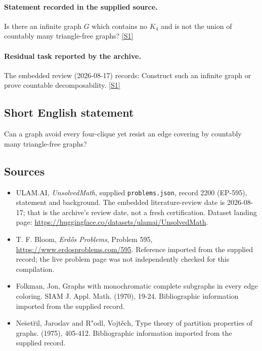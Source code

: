 \documentclass[11pt,a4paper]{article}
\newcommand{\sref}[2]{\hyperlink{source:#1:#2}{[S#2]}}
\begin{document}
\paragraph{Statement recorded in the supplied source.}
Is there an infinite graph $G$ which contains no $K_4$ and is not the union of countably many triangle-free graphs? \sref{2200}{1}

\paragraph{Residual task reported by the archive.}

The embedded review (2026-08-17) records: Construct such an infinite graph or prove countable decomposability. \sref{2200}{1}

\subsection{Short English statement}

Can a graph avoid every four-clique yet resist an edge covering by countably many triangle-free graphs?

\subsection{Sources}

{\small

\begin{itemize}

\item[\hypertarget{source:2200:1}{S1}] ULAM.AI, \emph{UnsolvedMath}, supplied \texttt{problems.json}, record 2200 (EP-595), statement and background. The embedded literature-review date is 2026-08-17; that is the archive’s review date, not a fresh certification. Dataset landing page: \url{https://huggingface.co/datasets/ulamai/UnsolvedMath}.

\item[\hypertarget{source:2200:2}{S2}] T. F. Bloom, \emph{Erdős Problems}, Problem 595, \url{https://www.erdosproblems.com/595}. Reference imported from the supplied record; the live problem page was not independently checked for this compilation.

\item[\hypertarget{source:2200:3}{S3}] Folkman, Jon, Graphs with monochromatic complete subgraphs in every edge coloring. SIAM J. Appl. Math. (1970), 19-24. Bibliographic information imported from the supplied record.

\item[\hypertarget{source:2200:4}{S4}] Ne\u set\u ril, Jaroslav and R"odl, Vojt\v ech, Type theory of partition properties of graphs. (1975), 405-412. Bibliographic information imported from the supplied record.

\end{itemize}

}

\label{end:2200}
\end{document}
